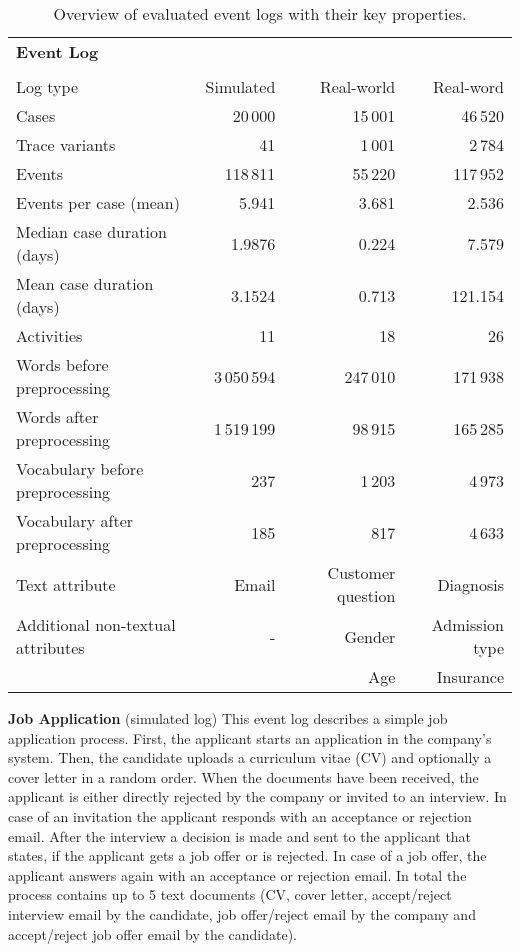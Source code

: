\begin{table}[!htbp]
	\begin{tabularx}{\textwidth}{l r r r}
		\toprule
		\textbf{Event Log} & \heading{\textbf{Job}} & \heading{\textbf{Customer}} &\heading{\textbf{Hospital}}  \\
		& \heading{\textbf{Application}} & \heading{\textbf{Journey}} &\heading{\textbf{Admission}}  \\
		\midrule
		Log type & Simulated & Real-world & Real-word\\
		Cases & 20\,000& 15\,001& 46\,520\\
		Trace variants &41 & 1\,001 &2\,784 \\
		Events & 118\,811 & 55\,220 & 117\,952\\
		Events per case (mean) & 5.941& 3.681& 2.536\\
		Median case duration (days) & 1.9876 & 0.224& 7.579\\
		Mean case duration (days)& 3.1524 &  0.713 & 121.154\\
		Activities & 11 & 18 & 26\\
		Words before preprocessing & 3\,050\,594 &247\,010 &  171\,938\\
		Words after preprocessing  &1\,519\,199 &98\,915 & 165\,285\\
		Vocabulary before preprocessing & 237 & 1\,203 & 4\,973 \\
		Vocabulary after preprocessing & 185 & 817 & 4\,633\\
		Text attribute & Email& Customer question & Diagnosis\\
		Additional non-textual attributes & - & Gender& Admission type\\
		&  & Age& Insurance\\
		\bottomrule
	\end{tabularx}
	\caption[Overview of evaluated event logs]{Overview of evaluated event logs with their key properties.}
	\label{tab:logs}
\end{table}

\textbf{Job Application} (simulated log) This event log describes a simple job application process. 
First, the applicant starts an application in the company's system.
Then, the candidate uploads a curriculum vitae (CV) and optionally a cover letter in a random order.
When the documents have been received, the applicant is either directly rejected by the company or invited to an interview.
In case of an invitation the applicant responds with an acceptance or rejection email.
After the interview a decision is made and sent to the applicant that states, if the applicant gets a job offer or is rejected.
In case of a job offer, the applicant answers again with an acceptance or rejection email.
In total the process contains up to 5 text documents (CV, cover letter, accept/reject interview email by the candidate, job offer/reject email by the company and accept/reject job offer email by the candidate).

